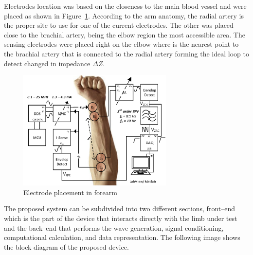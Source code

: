 
Electrodes location was based on the closeness to the main blood vessel and were placed as shown in Figure~\ref{fig:electrode}. According to the arm anatomy, the radial artery is the proper site to use for one of the current electrodes. The other was placed close to the brachial artery, being the elbow region the most accessible area. The sensing electrodes were placed right on the elbow where is the nearest point to the brachial artery that is connected to the radial artery forming the ideal loop to detect changed in impedance $\Delta Z$. 

\begin{figure}[!htpb]
	\centering
	\includegraphics[width=7.75cm,keepaspectratio]{figure1}	
    \caption{Electrode placement in forearm}
    \label{fig:electrode}
\end{figure}

The proposed system can be subdivided into two different sections, front–end which is the part of the device that interacts directly with the limb under test and the back–end that performs the wave generation, signal conditioning, computational calculation, and data representation. The following image shows the block diagram of the proposed device.

